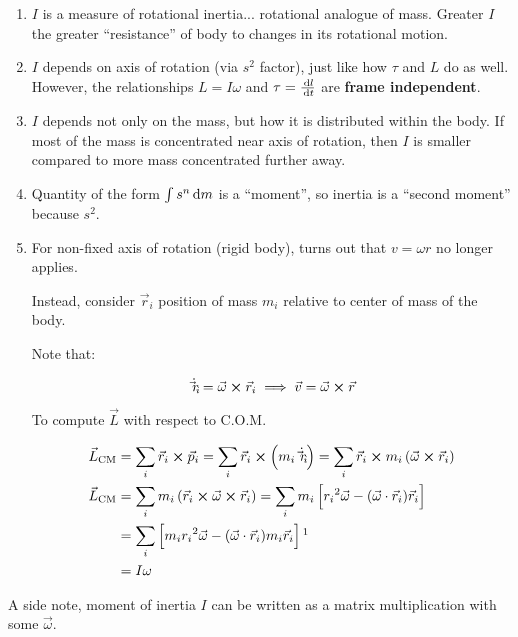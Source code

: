 \begin{enumerate}
	\item $I$ is a measure of rotational inertia... rotational analogue of mass. Greater $I$ the greater ``resistance'' of body to changes in its rotational motion.
	\item $I$ depends on axis of rotation (via $s^2$ factor), just like how $\tau$ and $L$ do as well. However, the relationships $L = I\omega$ and $\tau = \frac{\D l}{\D t}$ are \textbf{frame independent}.
	\item $I$ depends not only on the mass, but how it is distributed within the body. If most of the mass is concentrated near axis of rotation, then $I$ is smaller compared to more mass concentrated further away.
	\item Quantity of the form $\int s^n \D m$ is a ``moment'', so inertia is a ``second moment'' because $s^2$.
	\item For non-fixed axis of rotation (rigid body), turns out that $v = \omega r$ no longer applies.

	Instead, consider $\vec r_i$ position of mass $m_i$ relative to center of mass of the body.

	Note that:

	\begin{equation}
		\dot{\vec r_i} = \vec \omega \cross \vec r_i \implies \vec v = \vec \omega \cross \vec r
	\end{equation}

	To compute $\vec L$ with respect to C.O.M.

	\begin{align}
		\vec L_\mathrm{CM} &= \sum_i \vec r_i \cross \vec p_i = \sum_i \vec r_i \cross \left(m_i \dot{\vec r_i}\right) = \sum_i \vec r_i \cross m_i \left(\vec \omega \cross \vec r_i\right)\\
		\vec L_\mathrm{CM} &= \sum_i m_i \left(\vec r_i \cross \vec \omega \cross \vec r_i\right) = \sum_i m_i \left[{r_i}^2 \vec \omega - (\vec \omega \cdot \vec r_i) \vec r_i\right]\\
		&= \sum_i \left[m_i {r_i}^2 \vec \omega - (\vec \omega \cdot \vec r_i) m_i \vec r_i\right]\footnotemark\\
		&= I\omega
	\end{align}
\end{enumerate}

A side note, moment of inertia $I$ can be written as a matrix multiplication with some $\vec \omega$.

